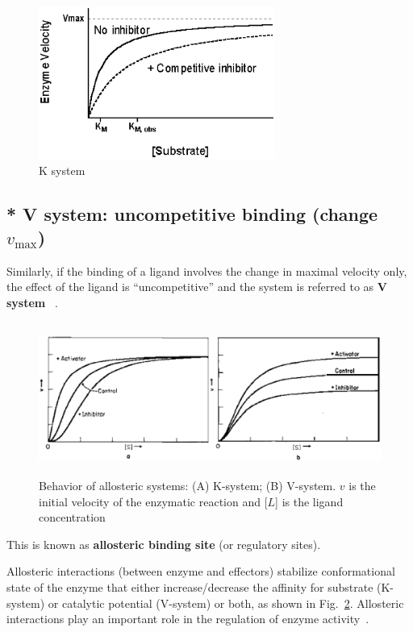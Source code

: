 \begin{figure}[hbt]
 \centerline{\includegraphics[height=5cm]{./images/K_system.eps}}
\caption{K system}
\label{fig:K_system}
\end{figure}

\subsection{* V system: uncompetitive binding (change $v_\max$)}


Similarly, if the
binding of a ligand involves the change in maximal velocity only, the
effect of the ligand is ``uncompetitive'' and the system is referred
to as {\bf V system} ~\citep{monod1965nat}. 

\begin{figure}[hbt]
 \centerline{\includegraphics[height=5cm]{./images/Allosteric_enzyme_K_V.eps}}
 \caption{Behavior of allosteric systems: (A) K-system; (B)
   V-system. $v$ is the initial velocity of the enzymatic reaction and
   [$L$] is the ligand concentration}
\label{fig:enzyme_K_V}
\end{figure}

This is known as {\bf allosteric binding site} (or regulatory
sites).


Allosteric interactions (between enzyme and effectors) stabilize
conformational state of the enzyme that either increase/decrease the
affinity for substrate (K-system) or catalytic potential (V-system) or
both, as shown in Fig.~\ref{fig:enzyme_K_V}. Allosteric interactions
play an important role in the regulation of enzyme
activity~\citep{hammes1973kae}.

